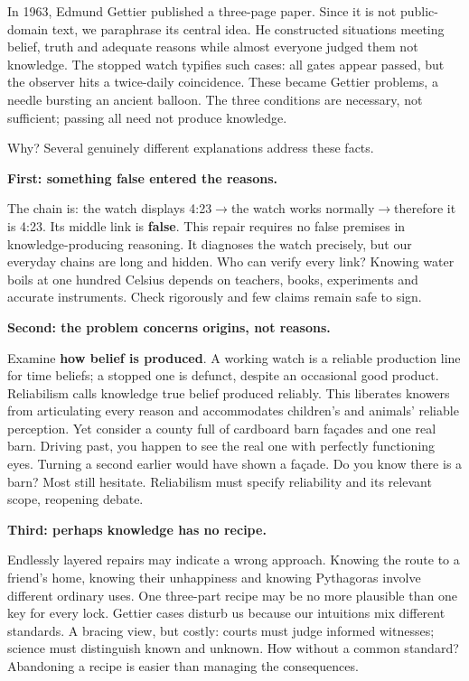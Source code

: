 In 1963, Edmund Gettier published a three-page paper. Since it is not public-domain text, we paraphrase its central idea. He constructed situations meeting belief, truth and adequate reasons while almost everyone judged them not knowledge. The stopped watch typifies such cases: all gates appear passed, but the observer hits a twice-daily coincidence. These became Gettier problems, a needle bursting an ancient balloon. The three conditions are necessary, not sufficient; passing all need not produce knowledge.

Why? Several genuinely different explanations address these facts.

\textbf{First: something false entered the reasons.}

The chain is: the watch displays 4:23$\rightarrow$the watch works normally$\rightarrow$therefore it is 4:23. Its middle link is \textbf{false}. This repair requires no false premises in knowledge-producing reasoning. It diagnoses the watch precisely, but our everyday chains are long and hidden. Who can verify every link? Knowing water boils at one hundred Celsius depends on teachers, books, experiments and accurate instruments. Check rigorously and few claims remain safe to sign.

\textbf{Second: the problem concerns origins, not reasons.}

Examine \textbf{how belief is produced}. A working watch is a reliable production line for time beliefs; a stopped one is defunct, despite an occasional good product. Reliabilism calls knowledge true belief produced reliably. This liberates knowers from articulating every reason and accommodates children's and animals' reliable perception. Yet consider a county full of cardboard barn façades and one real barn. Driving past, you happen to see the real one with perfectly functioning eyes. Turning a second earlier would have shown a façade. Do you know there is a barn? Most still hesitate. Reliabilism must specify reliability and its relevant scope, reopening debate.

\textbf{Third: perhaps knowledge has no recipe.}

Endlessly layered repairs may indicate a wrong approach. Knowing the route to a friend's home, knowing their unhappiness and knowing Pythagoras involve different ordinary uses. One three-part recipe may be no more plausible than one key for every lock. Gettier cases disturb us because our intuitions mix different standards. A bracing view, but costly: courts must judge informed witnesses; science must distinguish known and unknown. How without a common standard? Abandoning a recipe is easier than managing the consequences.


